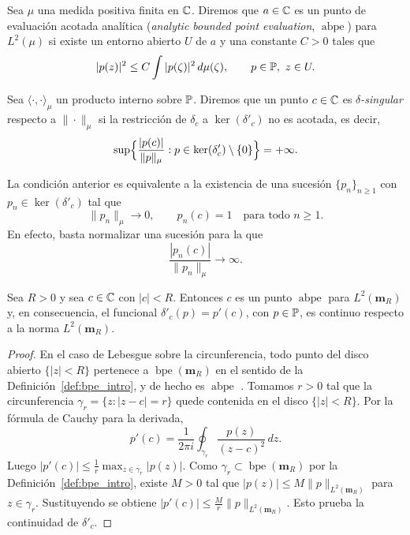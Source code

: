 \begin{defn}\label{def:bpe_ch3}
	Sea $\mu$ una medida positiva finita en $\mathbb{C}$. Diremos que $a\in\mathbb{C}$ es un punto de evaluación acotada analítica (\emph{analytic bounded point evaluation}, $\operatorname{abpe}$) \cite{conway2020approximationmeanrationalfunctions,aleman2009nontangential} para $L^2(\mu)$ si existe un entorno abierto $U$ de $a$ y una constante $C>0$ tales que
	\[
		|p(z)|^2\le C\int |p(\zeta)|^2\,d\mu(\zeta),
		\qquad p\in\mathbb{P},\ z\in U.
	\]
\end{defn}

\begin{defn}\label{def:delta_singular}
	Sea $\langle\cdot,\cdot\rangle_{\mu}$ un producto interno sobre $\mathbb{P}$. Diremos que un punto $c\in\mathbb{C}$ es \emph{$\delta$-singular} respecto a $\|\cdot\|_{\mu}$ si la restricción de $\delta_c$ a $\ker(\delta'_c)$ no es acotada, es decir,
	\[
		\sup\Bigl\{\frac{|p(c)|}{\|p\|_{\mu}}:p\in\ker(\delta'_c)\setminus\{0\}\Bigr\}=+\infty.
	\]
\end{defn}

\begin{rmk}
	La condición anterior es equivalente a la existencia de una sucesión $\{p_n\}_{n\ge1}$ con $p_n\in\ker(\delta'_c)$ tal que
	\[
		\|p_n\|_{\mu}\to0,
		\qquad
		p_n(c)=1
		\quad\text{para todo }n\ge1.
	\]
	En efecto, basta normalizar una sucesión para la que
	\[
		\frac{|p_n(c)|}{\|p_n\|_\mu}\to\infty.
	\]
\end{rmk}

\begin{lem}\label{lema:bpe_derivada}
	Sea $R>0$ y sea $c\in\mathbb{C}$ con $|c|<R$. Entonces $c$ es un punto $\operatorname{abpe}$ para $L^2(\mathbf{m}_R)$ y, en consecuencia, el funcional $\delta'_c(p)=p'(c)$, con $p\in\mathbb{P}$, es continuo respecto a la norma $L^2(\mathbf{m}_R)$.
\end{lem}

\begin{proof}
	En el caso de Lebesgue sobre la circunferencia, todo punto del disco abierto $\{|z|<R\}$ pertenece a $\operatorname{bpe}(\mathbf{m}_R)$ en el sentido de la Definición~\ref{def:bpe_intro}, y de hecho es $\operatorname{abpe}$ \cite{miller1999bounded,aleman2009nontangential}. Tomamos $r>0$ tal que la circunferencia $\gamma_r=\{z:|z-c|=r\}$ quede contenida en el disco $\{|z|<R\}$. Por la fórmula de Cauchy para la derivada,
	\[
		p'(c)=\frac{1}{2\pi i}\oint_{\gamma_r}\frac{p(z)}{(z-c)^2}\,dz.
	\]
	Luego $|p'(c)|\le \frac1r\max_{z\in\gamma_r}|p(z)|$. Como $\gamma_r\subset \operatorname{bpe}(\mathbf{m}_R)$ por la Definición~\ref{def:bpe_intro}, existe $M>0$ tal que $|p(z)|\le M\|p\|_{L^2(\mathbf{m}_R)}$ para $z\in\gamma_r$. Sustituyendo se obtiene $|p'(c)|\le \frac Mr\|p\|_{L^2(\mathbf{m}_R)}$.
	Esto prueba la continuidad de $\delta'_c$.
\end{proof}

